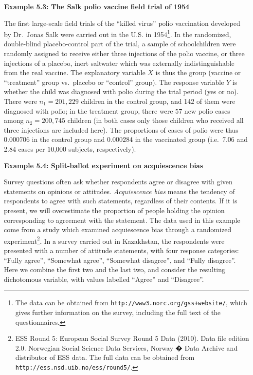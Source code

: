 \documentclass[11pt,a4paper,openany]{book}
\let\rmarkdownfootnote\footnote%
\def\footnote{\protect\rmarkdownfootnote}
\begin{document}
\textbf{Example 5.3: The Salk polio vaccine field trial of 1954}

The first large-scale field trials of the ``killed virus'' polio
vaccination developed by Dr.~Jonas Salk were carried out in the U.S. in
1954\footnote{The data can be obtained from
  \texttt{http://www3.norc.org/gss+website/}, which gives further
  information on the survey, including the full text of the
  questionnaires.}. In the randomized, double-blind placebo-control part
of the trial, a sample of schoolchildren were randomly assigned to
receive either three injections of the polio vaccine, or three
injections of a placebo, inert saltwater which was externally
indistinguishable from the real vaccine. The explanatory variable \(X\)
is thus the group (vaccine or ``treatment'' group vs.~placebo or
``control'' group). The response variable \(Y\) is whether the child was
diagnosed with polio during the trial period (yes or no). There were
\(n_{1}=201,229\) children in the control group, and 142 of them were
diagnosed with polio; in the treatment group, there were 57 new polio
cases among \(n_{2}=200,745\) children (in both cases only those
children who received all three injections are included here). The
proportions of cases of polio were thus \(0.000706\) in the control
group and \(0.000284\) in the vaccinated group (i.e.~7.06 and 2.84 cases
per 10,000 subjects, respectively).

\textbf{Example 5.4: Split-ballot experiment on acquiescence bias}

Survey questions often ask whether respondents agree or disagree with
given statements on opinions or attitudes. \emph{Acquiescence bias}
means the tendency of respondents to agree with such statements,
regardless of their contents. If it is present, we will overestimate the
proportion of people holding the opinion corresponding to agreement with
the statement. The data used in this example come from a study which
examined acquiescence bias through a randomized experiment\footnote{ESS
  Round 5: European Social Survey Round 5 Data (2010). Data file edition
  2.0. Norwegian Social Science Data Services, Norway � Data Archive and
  distributor of ESS data. The full data can be obtained from
  \texttt{http://ess.nsd.uib.no/ess/round5/}.}. In a survey carried out
in Kazakhstan, the respondents were presented with a number of attitude
statements, with four response categories: ``Fully agree'', ``Somewhat
agree'', ``Somewhat disagree'', and ``Fully disagree''. Here we combine
the first two and the last two, and consider the resulting dichotomous
variable, with values labelled ``Agree'' and ``Disagree''.
\end{document}
